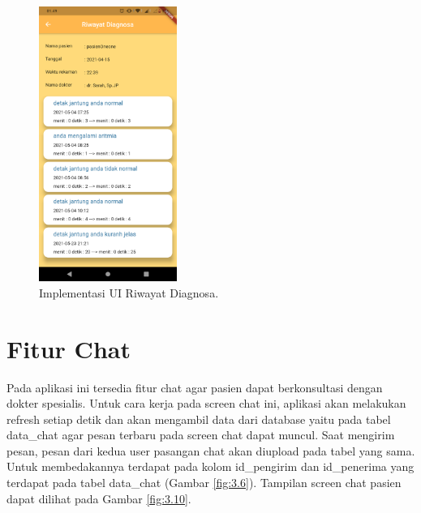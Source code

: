 \begin{figure}[H] \centering
	\includegraphics[width=0.4\textwidth]{img/layar_riwayatdiagnosa.png}
	\caption{Implementasi UI Riwayat Diagnosa.}
	\label{fig:3.9}
\end{figure}

\vspace{1ex}
\section{Fitur Chat}
\vspace{1ex}

Pada aplikasi ini tersedia fitur chat agar pasien dapat berkonsultasi dengan dokter spesialis. Untuk cara kerja pada screen chat ini, aplikasi akan melakukan refresh setiap detik dan akan mengambil data dari database yaitu pada tabel data\_chat agar pesan terbaru pada screen chat dapat muncul. Saat mengirim pesan, pesan dari kedua user pasangan chat akan diupload pada tabel yang sama. Untuk membedakannya terdapat pada kolom id\_pengirim dan id\_penerima yang terdapat pada tabel data\_chat (Gambar \ref{fig:3.6}). Tampilan screen chat pasien dapat dilihat pada Gambar \ref{fig:3.10}.

